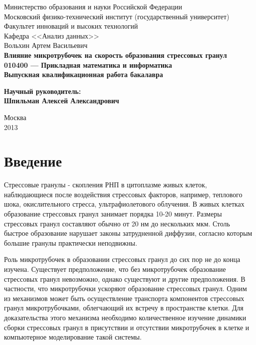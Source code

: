 \documentclass[14pt,a4paper]{extarticle}
\begin{document}
{
\fontsize{12pt}{15pt}
\thispagestyle{empty}
\begin{center}
    \sc
        Министерство образования и науки Российской Федерации\\
        Московский физико-технический институт
        {\rm(государственный университет)}\\
        Факультет инноваций и высоких технологий\\
        Кафедра <<Анализ данных>>\\[35mm]
    \rm\large
        Вольхин Артем Васильевич\\[10mm]
    \bf\Large
	    Влияние микротрубочек на скорость образования стрессовых гранул\\[10mm]
    \rm\normalsize
        010400 --- Прикладная математика и информатика\\[10mm]
    \sc
        Выпускная квалификационная работа бакалавра\\[10mm]
\end{center}
\hfill\parbox{80mm}{
    \begin{flushleft}
    \bf
        Научный руководитель:\\
    \rm
        Шпильман Алексей Александрович\\[5cm]
    \end{flushleft}
}
\vfill
\begin{center}
    Москва\\
    2013
\end{center}
}


\clearpage
\tableofcontents
\clearpage


\section{Введение} %
	 Стрессовые гранулы - скопления РНП в цитоплазме живых клеток, наблюдающиеся после воздействия стрессовых факторов, например, теплового шока, окислительного стресса, ультрафиолетового облучения. В живых клетках образование стрессовых гранул занимает порядка 10-20 минут. Размеры стрессовых гранул составляют обычно от 20 нм до нескольких мкм. Столь быстрое образование нарушает законы затрудненной диффузии, согласно которым большие гранулы практически неподвижны.

	 Роль микротрубочек в образовании стрессовых гранул до сих пор не до конца изучена. Существует предположение, что без микротрубочек образование стрессовых гранул невозможно, однако существуют и другие предположения. В частности, что микротрубочки ускоряют образование стрессовых гранул. Одним из механизмов может быть осуществление транспорта компонентов стрессовых гранул микротрубочками, облегчающий их встречу в пространстве клетки. Для доказательства этого механизма необходимо количественное изучение динамики сборки стрессовых гранул в присутствии и отсутствии микротрубочек в клетке и компьютерное моделирование такой системы.
	 
\end{document}
